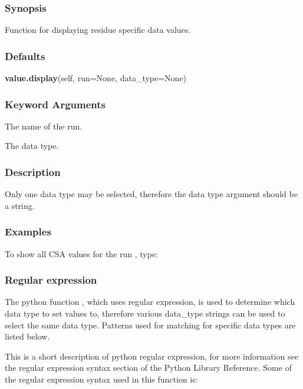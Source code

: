 \subsubsection{Synopsis}

Function for displaying residue specific data values.

\subsubsection{Defaults}

\textsf{\textbf{value.display}(self, run=None, data\_type=None)}


\subsubsection{Keyword Arguments}


  The name of the run.

  The data type.

\subsubsection{Description}

Only one data type may be selected, therefore the data type argument should be a string.


\subsubsection{Examples}

To show all CSA values for the run 
, type:






\subsubsection{Regular expression}

The python  function 
, which uses regular expression,  is used to determine which data
type to set values to, therefore various data\_type strings can be used to select the same
data type.  Patterns used for matching for specific data types are listed below.

This is a short description of python  regular expression,  for more information see the
regular expression  syntax section of the Python  Library Reference.  Some of the regular
expression syntax used in this function is:

